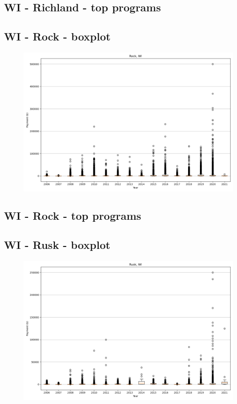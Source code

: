 \subsection*{WI - Richland - top programs}

\newpage
\subsection*{WI - Rock - boxplot}
\begin{figure}[h]
\centering
\includegraphics[width=7in]{../output/boxplots/counties/Rock-WI_boxplot.png}
\end{figure}


\subsection*{WI - Rock - top programs}

\newpage
\subsection*{WI - Rusk - boxplot}
\begin{figure}[h]
\centering
\includegraphics[width=7in]{../output/boxplots/counties/Rusk-WI_boxplot.png}
\end{figure}


